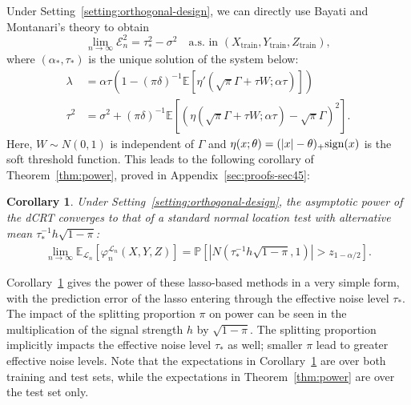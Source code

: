\documentclass[12pt]{article}
\newtheorem{corollary}{Corollary}
\theoremstyle{definition}
\theoremstyle{remark}
\newcommand{\srx}{X}
\newcommand{\srz}{Z}
\newcommand{\sry}{Y}
\begin{document}
Under Setting~\ref{setting:orthogonal-design}, we can directly use Bayati and Montanari's theory \cite{Bayati2011} to obtain 
\begin{equation}
\lim_{n \rightarrow \infty}\mathcal E_n^2 = \tau_*^2 - \sigma^2 \quad \text{a.s. in } (\srx_{\text{train}}, \sry_{\text{train}}, \srz_{\text{train}}),
\label{eq:bm-result}
\end{equation}
where $(\alpha_*,\tau_*)$ is the unique solution of the system below:
\begin{equation}
	\begin{split}
		\lambda &= \alpha \tau (1-(\pi\delta)^{-1}\mathbb E[\eta'(\sqrt \pi \Gamma + \tau W; \alpha \tau)]) \\
		\tau^2 &= \sigma^2 + (\pi\delta)^{-1}\mathbb E[(\eta(\sqrt \pi\Gamma + \tau W; \alpha \tau) - \sqrt \pi\Gamma)^2].
	\end{split}
	\label{eq:amp-system}
\end{equation}
Here, $W \sim N(0,1)$ is independent of $\Gamma$ and $\eta(x; \theta) = (|x|-\theta)_+\textnormal{sign}(x)$ is the soft threshold function. This leads to the following corollary of Theorem~\ref{thm:power}, proved in Appendix~\ref{sec:proofs-sec45}:
\begin{corollary} \label{cor:lasso}
Under Setting~\ref{setting:orthogonal-design}, the asymptotic power of the dCRT converges to that of a standard normal location test with alternative mean $\tau_*^{-1} h\sqrt{1-\pi}$:
\begin{equation}
	\begin{split}
	\lim_{n \rightarrow \infty}\mathbb E_{\mathcal L_n}[\varphi^{\mathcal L_n}_{n}(\srx, \sry, \srz)] =  \mathbb P[|N(\tau_*^{-1} h\sqrt{1-\pi},1)| > z_{1-\alpha/2}].
	\label{eq:lasso-power}
	\end{split}
\end{equation}
\end{corollary}
Corollary~\ref{cor:lasso} gives the power of these lasso-based methods in a very simple form, with the prediction error of the lasso entering through the effective noise level $\tau_*$. The impact of the splitting proportion $\pi$ on power can be seen in the multiplication of the signal strength $h$ by $\sqrt{1-\pi}$. The splitting proportion implicitly impacts the effective noise level $\tau_*$ as well; smaller $\pi$ lead to greater effective noise levels. Note that the expectations in Corollary~\ref{cor:lasso} are over both training and test sets, while the expectations in Theorem~\ref{thm:power} are over the test set only. 
\end{document}
